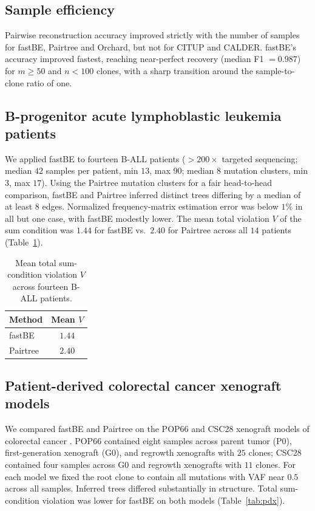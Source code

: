 \documentclass[11pt]{article}
\begin{document}
\subsection{Sample efficiency}
Pairwise reconstruction accuracy improved strictly with the number of samples for fastBE, Pairtree and Orchard, but not for CITUP and CALDER. fastBE's accuracy improved fastest, reaching near-perfect recovery (median F1 $= 0.987$) for $m \ge 50$ and $n < 100$ clones, with a sharp transition around the sample-to-clone ratio of one.

\subsection{B-progenitor acute lymphoblastic leukemia patients}
We applied fastBE to fourteen B-ALL patients \cite{dobson2020ball} ($>200\times$ targeted sequencing; median $42$ samples per patient, min $13$, max $90$; median $8$ mutation clusters, min $3$, max $17$). Using the Pairtree mutation clusters for a fair head-to-head comparison, fastBE and Pairtree inferred distinct trees differing by a median of at least $8$ edges. Normalized frequency-matrix estimation error was below $1\%$ in all but one case, with fastBE modestly lower. The mean total violation $V$ of the sum condition was $1.44$ for fastBE vs.\ $2.40$ for Pairtree across all $14$ patients (Table~\ref{tab:ball}).

\begin{table}[h]
\centering
\caption{Mean total sum-condition violation $V$ across fourteen B-ALL patients.}
\label{tab:ball}
\begin{tabular}{lc}
\toprule
Method & Mean $V$ \\
\midrule
fastBE & $1.44$ \\
Pairtree & $2.40$ \\
\bottomrule
\end{tabular}
\end{table}

\subsection{Patient-derived colorectal cancer xenograft models}
We compared fastBE and Pairtree on the POP66 and CSC28 xenograft models of colorectal cancer \cite{uchi2016pdx}. POP66 contained eight samples across parent tumor (P0), first-generation xenograft (G0), and regrowth xenografts with $25$ clones; CSC28 contained four samples across G0 and regrowth xenografts with $11$ clones. For each model we fixed the root clone to contain all mutations with VAF near $0.5$ across all samples. Inferred trees differed substantially in structure. Total sum-condition violation was lower for fastBE on both models (Table~\ref{tab:pdx}).
\end{document}
